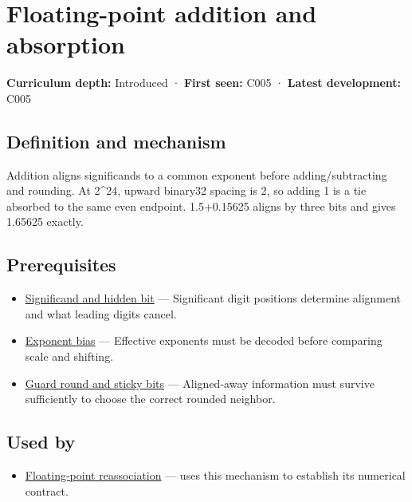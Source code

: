 \hypertarget{appendix-a1b1b4580dfd}{}\label{referencestart:appendix-a1b1b4580dfd}
\section{Floating-point addition and absorption}\label{appendix-a1b1b4580dfd-floating-point-addition-and-absorption}

\textbf{Curriculum depth:} Introduced · \textbf{First seen:} C005 · \textbf{Latest development:} C005

\subsection{Definition and mechanism}\label{appendix-a1b1b4580dfd-definition-and-mechanism}

Addition aligns significands to a common exponent before adding/subtracting and rounding. At 2\^{}24, upward binary32 spacing is 2, so adding 1 is a tie absorbed to the same even endpoint. 1.5+0.15625 aligns by three bits and gives 1.65625 exactly.

\subsection{Prerequisites}\label{appendix-a1b1b4580dfd-prerequisites}

\begin{itemize}
\tightlist
\item
  \hyperref[appendix-a24fd710cf67]{Significand and hidden bit} --- Significant digit positions determine alignment and what leading digits cancel.
\item
  \hyperref[appendix-2fae058c82e1]{Exponent bias} --- Effective exponents must be decoded before comparing scale and shifting.
\item
  \hyperref[appendix-b572b631069b]{Guard round and sticky bits} --- Aligned-away information must survive sufficiently to choose the correct rounded neighbor.
\end{itemize}

\subsection{Used by}\label{appendix-a1b1b4580dfd-used-by}

\begin{itemize}
\tightlist
\item
  \hyperref[appendix-c2ac4a84c283]{Floating-point reassociation} --- uses this mechanism to establish its numerical contract.
\end{itemize}

